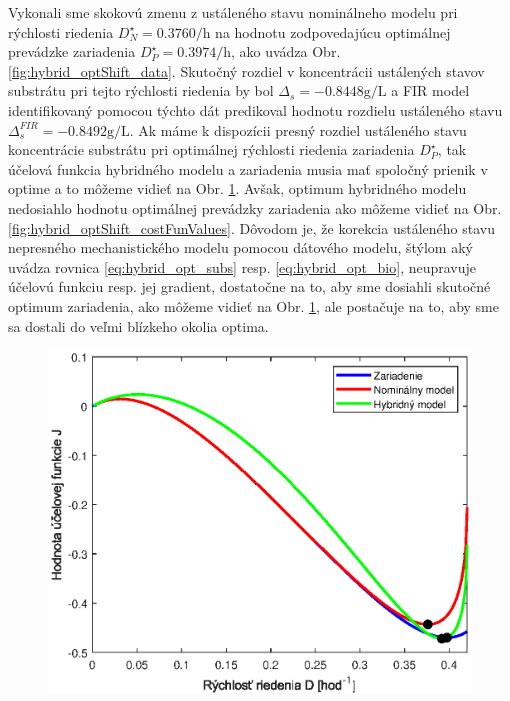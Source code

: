 Vykonali sme skokovú zmenu z ustáleného stavu nominálneho modelu pri rýchlosti riedenia $ D_{N}^{\star} = 0.3760\si{\per\hour} $ na hodnotu zodpovedajúcu optimálnej prevádzke zariadenia $ D_{P}^{\star} = 0.3974\si{\per\hour} $, ako uvádza Obr. \ref{fig:hybrid_optShift_data}. Skutočný rozdiel v koncentrácii ustálených stavov substrátu pri tejto rýchlosti riedenia by bol $ \Delta_{s} = -0.8448\si{\gram\per\liter} $ a FIR model identifikovaný pomocou týchto dát predikoval hodnotu rozdielu ustáleného stavu $ \Delta_{s}^{FIR} = -0.8492\si{\gram\per\liter} $. Ak máme k dispozícii presný rozdiel ustáleného stavu koncentrácie substrátu pri optimálnej rýchlosti riedenia zariadenia $ D_{P}^{\star} $, tak účelová funkcia hybridného modelu a zariadenia musia mať spoločný prienik v optime a to môžeme vidieť na Obr. \ref{fig:hybrid_and_monod_costFun_compar}. Avšak, optimum hybridného modelu nedosiahlo hodnotu optimálnej prevádzky zariadenia ako môžeme vidieť na Obr. \ref{fig:hybrid_optShift_costFunValues}. Dôvodom je, že korekcia ustáleného stavu nepresného mechanistického modelu pomocou dátového modelu, štýlom aký uvádza rovnica \eqref{eq:hybrid_opt_subs} resp. \eqref{eq:hybrid_opt_bio}, neupravuje účelovú funkciu resp. jej gradient, dostatočne na to, aby sme dosiahli skutočné optimum zariadenia, ako môžeme vidieť na Obr. \ref{fig:hybrid_and_monod_costFun_compar}, ale postačuje na to, aby sme sa dostali do veľmi blízkeho okolia optima.
\begin{figure}
	\centering
	\includegraphics[width=0.7\linewidth]{images/hybrid_and_monod_costFun_compar}
	\caption{}
	\label{fig:hybrid_and_monod_costFun_compar}
\end{figure}

